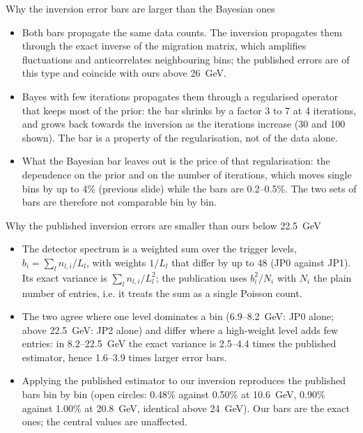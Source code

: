 \begin{frame}{Why the inversion error bars are larger than the Bayesian ones}
\begin{itemize}\footnotesize
\item Both bars propagate the same data counts. The inversion propagates them through the exact inverse of the migration matrix, which amplifies fluctuations and anticorrelates neighbouring bins; the published errors are of this type and coincide with ours above 26~GeV.
\item Bayes with few iterations propagates them through a regularised operator that keeps most of the prior: the bar shrinks by a factor 3 to 7 at 4 iterations, and grows back towards the inversion as the iterations increase (30 and 100 shown). The bar is a property of the regularisation, not of the data alone.
\item What the Bayesian bar leaves out is the price of that regularisation: the dependence on the prior and on the number of iterations, which moves single bins by up to 4\% (previous slide) while the bars are 0.2--0.5\%. The two sets of bars are therefore not comparable bin by bin.
\end{itemize}
\end{frame}

\begin{frame}{Why the published inversion errors are smaller than ours below 22.5~GeV}
\begin{itemize}\footnotesize
\item The detector spectrum is a weighted sum over the trigger levels, $b_i=\sum_l n_{l,i}/L_l$, with weights $1/L_l$ that differ by up to 48 (JP0 against JP1). Its exact variance is $\sum_l n_{l,i}/L_l^2$; the publication uses $b_i^2/N_i$ with $N_i$ the plain number of entries, i.e. it treats the sum as a single Poisson count.
\item The two agree where one level dominates a bin (6.9--8.2~GeV: JP0 alone; above 22.5~GeV: JP2 alone) and differ where a high-weight level adds few entries: in 8.2--22.5~GeV the exact variance is 2.5--4.4 times the published estimator, hence 1.6--3.9 times larger error bars.
\item Applying the published estimator to our inversion reproduces the published bars bin by bin (open circles: 0.48\% against 0.50\% at 10.6~GeV, 0.90\% against 1.00\% at 20.8~GeV, identical above 24~GeV). Our bars are the exact ones; the central values are unaffected.
\end{itemize}
\end{frame}

